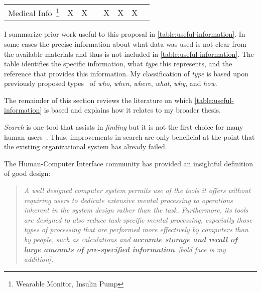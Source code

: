 \begin{table}[tbph]
\begin{minipage}{\textwidth}
\begin{tabular}{p{3cm}ccccccl}
            \rowcolor[rgb]{ .851,  .851,  .851}
            Medical Info~\footnote{Wearable Monitor, Insulin Pump}       & X                                                     & X                                                                                          &                                                         & X                                                                                          & X                                                     & X                                                                                         &
            \tabularnewline
        \end{tabular}%
    \end{minipage}
\end{table}


I summarize prior work useful to this proposal in
\autoref{table:useful-information}.  In some cases the precise information about
what data was used is not clear from the available materials and thus is not
included in \autoref{table:useful-information}.  The table identifies the
specific information, what \emph{type} this represents, and the reference that
provides this information. My classification of \emph{type} is based upon
previously proposed types~\cite{vianna2019searching} of \emph{who}, \emph{when},
\emph{where}, \emph{what}, \emph{why}, and \emph{how}.

The remainder of this section reviews the literature on which
\autoref{table:useful-information} is based and explains how it
relates to my broader thesis.

\emph{Search} is one tool that assists in \emph{finding} but it is not the first
choice for many human users~\cite{bergman2019search}.  Thus, improvements in search
are only beneficial at the point that the existing organizational system has
already failed.

The Human-Computer Interface community has provided an insightful definition of
good design:

\begin{quotation}
    \emph{
        A well designed computer system permits use of the tools it offers without
        requiring users to dedicate extensive mental processing to operations
        inherent in the system design rather than the task.  Furthermore, its
        tools are designed to also reduce task-specific mental processing,
        especially those types of processing that are performed more effectively
        by computers than by people, such as calculations and \textbf{accurate storage and
            recall of large amounts of pre-specified
            information}~\cite{brown1999human}\emph{[bold face is my addition]}.
    }
\end{quotation}

